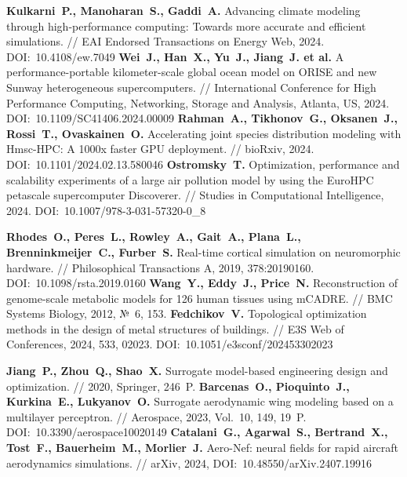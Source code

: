 \begin{thebibliography}{99}
\textbf{Kulkarni~P., Manoharan~S., Gaddi~A.} Advancing climate modeling through high-performance computing: Towards more accurate and efficient simulations. // EAI Endorsed Transactions on Energy Web, 2024. DOI:~10.4108/ew.7049
\textbf{Wei~J., Han~X., Yu~J., Jiang~J. et al.} A performance-portable kilometer-scale global ocean model on ORISE and new Sunway heterogeneous supercomputers. // International Conference for High Performance Computing, Networking, Storage and Analysis, Atlanta, US, 2024. DOI:~10.1109/SC41406.2024.00009
\textbf{Rahman~A., Tikhonov~G., Oksanen~J., Rossi~T., Ovaskainen~O.} Accelerating joint species distribution modeling with Hmsc-HPC: A 1000x faster GPU deployment. // bioRxiv, 2024. DOI:~10.1101/2024.02.13.580046
\textbf{Ostromsky~T.} Optimization, performance and scalability experiments of a large air pollution model by using the EuroHPC petascale supercomputer Discoverer. // Studies in Computational Intelligence, 2024. DOI:~10.1007/978-3-031-57320-0\_8

\textbf{Rhodes~O., Peres~L., Rowley~A., Gait~A., Plana~L., Brenninkmeijer~C., Furber~S.} Real-time cortical simulation on neuromorphic hardware. // Philosophical Transactions A, 2019, 378:20190160. DOI:~10.1098/rsta.2019.0160
\textbf{Wang~Y., Eddy~J., Price~N.} Reconstruction of genome-scale metabolic models for 126 human tissues using mCADRE. // BMC Systems Biology, 2012, №~6, 153.
\textbf{Fedchikov~V.} Topological optimization methods in the design of metal structures of buildings. // E3S Web of Conferences, 2024, 533, 02023. DOI:~10.1051/e3sconf/202453302023

\textbf{Jiang~P., Zhou~Q., Shao~X.} Surrogate model-based engineering design and optimization. // 2020, Springer, 246~P.
\textbf{Barcenas~O., Pioquinto~J., Kurkina~E., Lukyanov~O.} Surrogate aerodynamic wing modeling based on a multilayer perceptron. // Aerospace, 2023, Vol.~10, 149, 19~P. DOI:~10.3390/aerospace10020149
\textbf{Catalani~G., Agarwal~S., Bertrand~X., Tost~F., Bauerheim~M., Morlier~J.} Aero-Nef: neural fields for rapid aircraft aerodynamics simulations. // arXiv, 2024, DOI:~10.48550/arXiv.2407.19916


\end{thebibliography}
